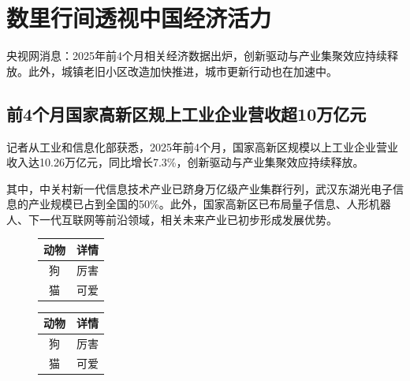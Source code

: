 \section{数里行间透视中国经济活力}
央视网消息：2025年前4个月相关经济数据出炉\cite{jin2001}，创新驱动与产业集聚效应持续释放。此外，城镇老旧小区改造加快推进，城市更新行动也在加速中。\cite{tong1999}

\subsection{前4个月国家高新区规上工业企业营收超10万亿元}
记者从工业和信息化部获悉，2025年前4个月，国家高新区规模以上工业企业营业收入达10.26万亿元，同比增长7.3\%，创新驱动与产业集聚效应持续释放。\cite{riley1990}

其中，中关村新一代信息技术产业已跻身万亿级产业集群行列\cite{cctvnews}，武汉东湖光电子信息的产业规模已占到全国的50\%。此外，国家高新区已布局量子信息、人形机器人、下一代互联网等前沿领域，相关未来产业已初步形成发展优势。\cite{han1996}

\begin{figure}[htbp!]
	\centering
	\begin{minipage}[b]{.5\textwidth}
		\centering
		\label{tab:t2} %
		\begin{tabular}{cp{6cm}}
			\toprule
			动物 & 详情 \\
			\midrule
			狗    & 厉害 \\
			\addlinespace
			猫    & 可爱\\
			\bottomrule
		\end{tabular}
	\end{minipage}
	\qquad
	\begin{minipage}[b]{.3\textwidth}
		\centering
		
		\label{tab:t3} %
		\begin{tabular}{cc}
			\toprule
			动物 & 详情 \\
			\midrule
			狗    & 厉害 \\
			\addlinespace
			猫    & 可爱\\
			\bottomrule
		\end{tabular}
	\end{minipage}
\end{figure}

